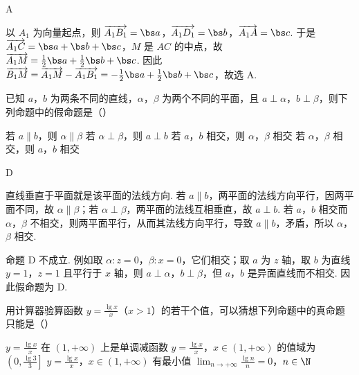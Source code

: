 \begin{answer}
A
\end{answer}

\begin{solution}
以 \(A_1\) 为向量起点，则 \(\overrightarrow{A_1B_1}=\bs a\)，\(\overrightarrow{A_1D_1}=\bs b\)，\(\overrightarrow{A_1A}=\bs c\). 于是 \(\overrightarrow{A_1C}=\bs a+\bs b+\bs c\)，\(M\) 是 \(AC\) 的中点，故 \(\overrightarrow{A_1M}=\frac12\bs a+\frac12\bs b+\bs c\). 因此 \(\overrightarrow{B_1M}=\overrightarrow{A_1M}-\overrightarrow{A_1B_1}=-\frac12\bs a+\frac12\bs b+\bs c\)，故选 A.
\end{solution}

\begin{problem}
已知 \(a\)，\(b\) 为两条不同的直线，\(\alpha\)，\(\beta\) 为两个不同的平面，且 \(a\perp\alpha\)，\(b\perp\beta\)，则下列命题中的假命题是（\quad）

\choices
    {若 \(a\parallel b\)，则 \(\alpha\parallel\beta\)}
    {若 \(\alpha\perp\beta\)，则 \(a\perp b\)}
    {若 \(a\)，\(b\) 相交，则 \(\alpha\)，\(\beta\) 相交}
    {若 \(\alpha\)，\(\beta\) 相交，则 \(a\)，\(b\) 相交}
\end{problem}

\begin{answer}
D
\end{answer}

\begin{solution}
直线垂直于平面就是该平面的法线方向. 若 \(a\parallel b\)，两平面的法线方向平行，因两平面不同，故 \(\alpha\parallel\beta\)；若 \(\alpha\perp\beta\)，两平面的法线互相垂直，故 \(a\perp b\). 若 \(a\)，\(b\) 相交而 \(\alpha\)，\(\beta\) 不相交，则两平面平行，从而其法线方向平行，导致 \(a\parallel b\)，矛盾，所以 \(\alpha\)，\(\beta\) 相交.

命题 D 不成立. 例如取 \(\alpha:z=0\)，\(\beta:x=0\)，它们相交；取 \(a\) 为 \(z\) 轴，取 \(b\) 为直线 \(y=1\)，\(z=1\) 且平行于 \(x\) 轴，则 \(a\perp\alpha\)，\(b\perp\beta\)，但 \(a\)，\(b\) 是异面直线而不相交. 因此假命题为 D.
\end{solution}

\begin{problem}
用计算器验算函数 \(y=\frac{\lg x}{x}\)（\(x>1\)）的若干个值，可以猜想下列命题中的真命题只能是（\quad）

\choices
    {\(y=\frac{\lg x}{x}\) 在 \((1,+\infty)\) 上是单调减函数}
    {\(y=\frac{\lg x}{x}\)，\(x\in(1,+\infty)\) 的值域为 \(\left(0,\frac{\lg3}{3}\right]\)}
    {\(y=\frac{\lg x}{x}\)，\(x\in(1,+\infty)\) 有最小值}
    {\(\displaystyle\lim_{n\to+\infty}\frac{\lg n}{n}=0\)，\(n\in\N\)}
\end{problem}


